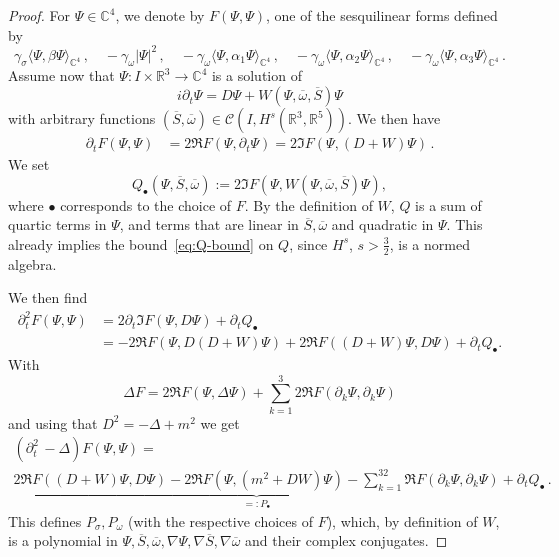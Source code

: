 \documentclass[10pt]{amsart}
\theoremstyle{definition}\newtheorem{defi}[theo]{Definition}\newtheorem{rema}[theo]{Remark}\newtheorem{exam}[theo]{Example}\newtheorem{exem}[theo]{Example}\newtheorem{nota}[theo]{Notation}
\newcommand{\cC}{\mathcal{C}}
\newcommand\R{\mathbb{R}}
\newcommand\C{\mathbb{C}}
\begin{document}
\begin{proof}
For $\Psi\in\C^4$, we denote by $F(\Psi, \Psi)$, one of the sesquilinear forms defined by
\[
\gamma_\sigma\langle \Psi, \beta\Psi\rangle_{\C^4}\,,\quad -\gamma_\omega|\Psi|^2\,,\quad -\gamma_\omega\langle\Psi, \alpha_1\Psi\rangle_{\C^4}\,,\quad -\gamma_\omega\langle\Psi, \alpha_2\Psi\rangle_{\C^4}\,,\quad -\gamma_\omega\langle\Psi, \alpha_3\Psi\rangle_{\C^4}\,.
\]
Assume now that $\Psi:I \times \R^3 \to \C^4 $ is a solution of
\begin{equation}\label{eqPsiW}
i\partial_t \Psi=D \Psi + W(\Psi,\overline{\omega},\overline{S}) \Psi
\end{equation}
with arbitrary functions $(\overline{S}, \overline{\omega})\in \cC(I, H^{s}(\R^3,\R^5))$. We then have
\[
\begin{split}
\partial_t F(\Psi,\Psi) &= 2\Re F(\Psi,\partial_t\Psi) = 2 \Im F(\Psi, (D + W) \Psi) \,.
\end{split}
\]
We set
\begin{equation}\label{eq:Q def}
Q_\bullet(\Psi, \overline{S}, \overline{\omega}):=2\Im F(\Psi, W(\Psi,\overline{\omega},\overline{S})\Psi),
\end{equation}
where $\bullet$ corresponds to the choice of $F$. By the definition of $W$, $Q$ is a sum of quartic terms in $\Psi$, and terms that are linear in $\overline{S}, \overline{\omega}$ and quadratic in $\Psi$. This already implies the bound~\eqref{eq:Q-bound} on $Q$, since $H^s$, $s>\tfrac32$, is a normed algebra.

We then find
\begin{align*}
\partial_t^2 F(\Psi,\Psi) & = 2\partial_t \Im F(\Psi, D \Psi) + \partial_t Q_\bullet \\
&= - 2 \Re F(\Psi, D (D+W) \Psi) + 2 \Re F((D+W)\Psi, D \Psi) + \partial_t Q_\bullet.
\end{align*}
With
\begin{equation*}
\Delta F = 2\Re F(\Psi, \Delta \Psi) + \sum_{k=1}^3 2 \Re F(\partial_k \Psi, \partial_k \Psi)
\end{equation*}
and using that $ D^2 = -\Delta+m^2 $ we get
\begin{multline*}
(\partial_t^2\,-\Delta)F(\Psi,\Psi) =\\
 \underbrace{2\Re F((D+W)\Psi,D\Psi) -2\Re F\left(\Psi,(m^2+ D W)\Psi\right) -\sum_{k=1}^32\Re F(\partial_k\Psi,\partial_k\Psi)}_{=:P_\bullet} + \partial_t Q_\bullet\,.
\end{multline*}
This defines $P_\sigma, P_\omega$ (with the respective choices of $F$), which, by definition of $W$, is a polynomial in $\Psi, \overline{S}, \overline{\omega}, \nabla\Psi, \nabla \overline{S}, \nabla \overline{\omega}$ and their complex conjugates.


\end{proof}
\end{document}
